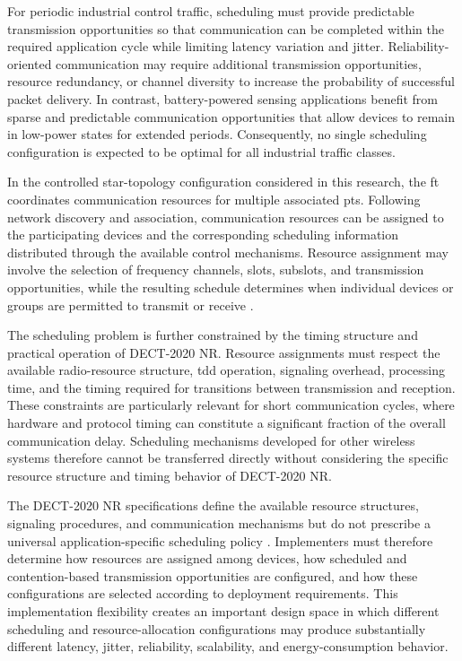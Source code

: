 \documentclass[12pt,a4paper]{article}
\begin{document}
For periodic industrial control traffic, scheduling must provide predictable transmission opportunities so that communication can be completed within the required application cycle while limiting latency variation and jitter. Reliability-oriented communication may require additional transmission opportunities, resource redundancy, or channel diversity to increase the probability of successful packet delivery. In contrast, battery-powered sensing applications benefit from sparse and predictable communication opportunities that allow devices to remain in low-power states for extended periods. Consequently, no single scheduling configuration is expected to be optimal for all industrial traffic classes.

In the controlled star-topology configuration considered in this research, the \gls{ft} coordinates communication resources for multiple associated \glspl{pt}. Following network discovery and association, communication resources can be assigned to the participating devices and the corresponding scheduling information distributed through the available control mechanisms. Resource assignment may involve the selection of frequency channels, slots, subslots, and transmission opportunities, while the resulting schedule determines when individual devices or groups are permitted to transmit or receive \cite{etsi_ts103636_3,etsi_ts103636_4}.

The scheduling problem is further constrained by the timing structure and practical operation of DECT-2020 NR. Resource assignments must respect the available radio-resource structure, \gls{tdd} operation, signaling overhead, processing time, and the timing required for transitions between transmission and reception. These constraints are particularly relevant for short communication cycles, where hardware and protocol timing can constitute a significant fraction of the overall communication delay. Scheduling mechanisms developed for other wireless systems therefore cannot be transferred directly without considering the specific resource structure and timing behavior of DECT-2020 NR.

The DECT-2020 NR specifications define the available resource structures, signaling procedures, and communication mechanisms but do not prescribe a universal application-specific scheduling policy \cite{etsi_ts103636_3,etsi_ts103636_4}. Implementers must therefore determine how resources are assigned among devices, how scheduled and contention-based transmission opportunities are configured, and how these configurations are selected according to deployment requirements. This implementation flexibility creates an important design space in which different scheduling and resource-allocation configurations may produce substantially different latency, jitter, reliability, scalability, and energy-consumption behavior.
\end{document}
